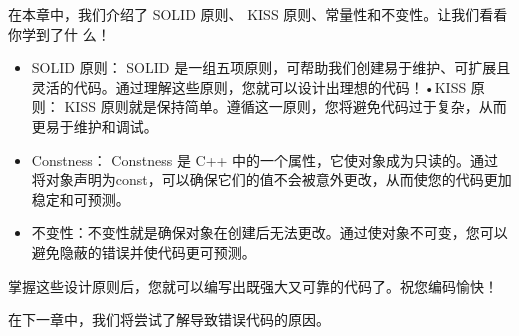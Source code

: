 在本章中，我们介绍了 SOLID 原则、 KISS 原则、常量性和不变性。让我们看看你学到了什
么！

\begin{itemize}
\item
SOLID 原则： SOLID 是一组五项原则，可帮助我们创建易于维护、可扩展且灵活的代码。通过理解这些原则，您就可以设计出理想的代码！•KISS 原则： KISS 原则就是保持简单。遵循这一原则，您将避免代码过于复杂，从而更易于维护和调试。

\item
Constness： Constness 是 C++ 中的一个属性，它使对象成为只读的。通过将对象声明为const，可以确保它们的值不会被意外更改，从而使您的代码更加稳定和可预测。

\item
不变性：不变性就是确保对象在创建后无法更改。通过使对象不可变，您可以避免隐蔽的错误并使代码更可预测。
\end{itemize}

掌握这些设计原则后，您就可以编写出既强大又可靠的代码了。祝您编码愉快！

在下一章中，我们将尝试了解导致错误代码的原因。